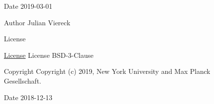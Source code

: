 \begin{DoxyDate}{Date}
2019-\/03-\/01
\end{DoxyDate}
\begin{DoxyAuthor}{Author}
Julian Viereck 
\end{DoxyAuthor}
\begin{DoxyRefDesc}{License}
\item[\hyperlink{license__license000020}{License}]License B\+S\+D-\/3-\/\+Clause \end{DoxyRefDesc}
\begin{DoxyCopyright}{Copyright}
Copyright (c) 2019, New York University and Max Planck Gesellschaft. 
\end{DoxyCopyright}
\begin{DoxyDate}{Date}
2018-\/12-\/13 
\end{DoxyDate}
